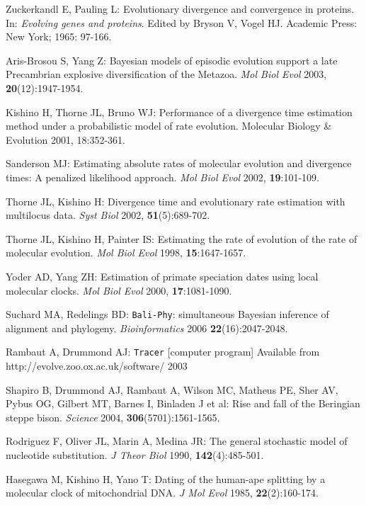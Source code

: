 \documentclass[cup7b, english]{cupbook}
\begin{document}
\begin{thebibliography}{77}
Zuckerkandl E, Pauling L: Evolutionary divergence
and convergence in proteins. In: \emph{Evolving genes and proteins}.
Edited by Bryson V, Vogel HJ. Academic Press: New York; 1965: 97-166.

Aris-Brosou S, Yang Z: Bayesian models of episodic
evolution support a late Precambrian explosive diversification of
the Metazoa. \emph{Mol Biol Evol} 2003, \textbf{20}(12):1947-1954.

Kishino H, Thorne JL, Bruno WJ: Performance of a
divergence time estimation method under a probabilistic model of rate
evolution. Molecular Biology \& Evolution 2001, 18:352-361.

Sanderson MJ: Estimating absolute rates of
molecular evolution and divergence times: A penalized likelihood approach.
\emph{Mol Biol Evol} 2002, \textbf{19}:101-109.

Thorne JL, Kishino H: Divergence time and evolutionary
rate estimation with multilocus data. \emph{Syst Biol} 2002, \textbf{51}(5):689-702.

Thorne JL, Kishino H, Painter IS: Estimating the
rate of evolution of the rate of molecular evolution. \emph{Mol Biol
Evol} 1998, \textbf{15}:1647-1657.

Yoder AD, Yang ZH: Estimation of primate speciation
dates using local molecular clocks. \emph{Mol Biol Evol} 2000, \textbf{17}:1081-1090.

Suchard MA, Redelings BD: \texttt{Bali-Phy}: simultaneous
Bayesian inference of alignment and phylogeny. \emph{Bioinformatics}
2006 \textbf{22}(16):2047-2048.

Rambaut A, Drummond AJ: \texttt{Tracer} {[}computer program]
Available from http://evolve.zoo.ox.ac.uk/software/ 2003

Shapiro B, Drummond AJ, Rambaut A, Wilson
MC, Matheus PE, Sher AV, Pybus OG, Gilbert MT, Barnes I, Binladen
J et al: Rise and fall of the Beringian steppe bison. \emph{Science}
2004, \textbf{306}(5701):1561-1565.

Rodriguez F, Oliver JL, Marin A, Medina JR: The
general stochastic model of nucleotide substitution. \emph{J Theor
Biol} 1990, \textbf{142}(4):485-501.

Hasegawa M, Kishino H, Yano T: Dating of the human-ape
splitting by a molecular clock of mitochondrial DNA. \emph{J Mol Evol}
1985, \textbf{22}(2):160-174.


\end{thebibliography}
\end{document}
